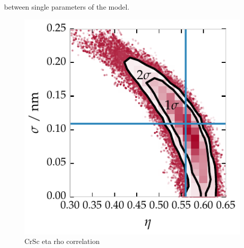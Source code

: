 between single parameters of the model.
\begin{figure}[htbp]
  \centering
  \includegraphics{img/CrSc_eta_rho_correlation}
  \caption{CrSc eta rho correlation}
  \label{ch_spec:fig_CrSc_eta_rho_correlation}
\end{figure}
\cite{haase_multiparameter_2016}


